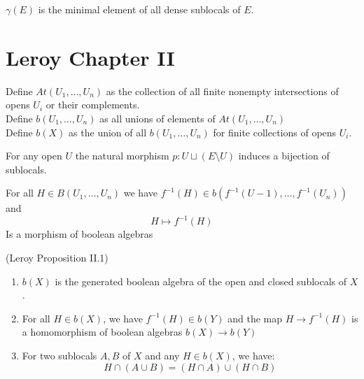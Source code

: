 \begin{definition}[gamma]
    \label{def:gamma}
    $\gamma(E)$ is the minimal element of all dense sublocals of $E$.
\end{definition}


\chapter{Leroy Chapter II}\label{sec:leroy-chapter-ii}
\begin{definition}
    \label{def:induced_boolean_algebra}
    Define $At(U_1,\dots,U_n)$ as the collection of all finite nonempty intersections of opens $U_i$ or their complements. \\
    Define $b(U_1,\dots,U_n)$ as all unions of elements of $At(U_1,\dots,U_n)$\\
    Define $b(X)$ as the union of all $b(U_1,\dots,U_n)$ for finite collections of opens $U_i$.
\end{definition}

\begin{lemma}
    \label{lem:sublocals_and_decompositions}
    For any open $U$ the natural morphism $p : U \sqcup (E \setminus U)$ induces a bijection of sublocals.
\end{lemma}

\begin{lemma}
    \label{lem:induced_morphism_of_boolean_algebras}
    For all $H \in B(U_1,\dots,U_n)$ we have $f^{-1}(H) \in b(f^{-1}(U-1),\dots,f^{-1}(U_n))$ and \[H \mapsto f^{-1}(H)    \]
    Is a morphism of boolean algebras
\end{lemma}

\begin{proposition}
(Leroy Proposition II.1)
    \label{prop:boolean_algebra}
    \begin{enumerate}
        \item $b(X)$ is the generated boolean algebra of the open and closed sublocals of $X$.
        \item For all $H \in b(X)$, we have $f^{-1}(H) \in b(Y)$ and the map $H \to f^{-1}(H)$ is a homomorphism of boolean algebras $b(X) \to b(Y)$
        \item For two sublocals $A, B$ of $X$ and any $H \in b(X)$, we have: \[H \cap (A \cup B ) = (H \cap A) \cup (H \cap B)\]
    \end{enumerate}
\end{proposition}

